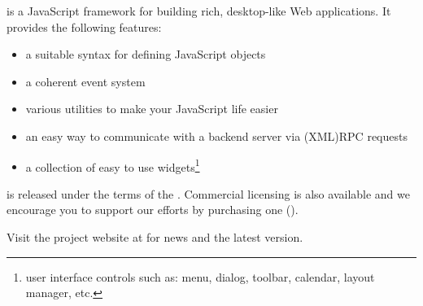 \TheLibName{} is a JavaScript framework for building rich, desktop-like Web
applications.  It provides the following features:

\begin{itemize}
\item a suitable syntax for defining JavaScript objects
\item a coherent event system
\item various utilities to make your JavaScript life easier
\item an easy way to communicate with a backend server via (XML)RPC requests
\item a collection of easy to use widgets\footnote{user interface controls such
  as: menu, dialog, toolbar, calendar, layout manager, etc.}
\end{itemize}

\TheLibName{} is released under the terms of the \TheLibOSLicense.  Commercial
licensing is also available and we encourage you to support our efforts by
purchasing one (\TheLibLicenseURL).

Visit the project website at \TheLibURL{} for news and the latest version.


